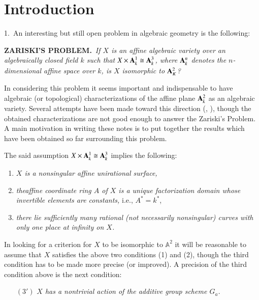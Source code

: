 \thispagestyle{empty}

\chapter*{Introduction}\pageoriginale


1.~An interesting but still open problem in algebraic geometry is the following:

\medskip
\noindent
{\bf ZARISKI'S PROBLEM.}~{\em If $X$ is an affine algebraic variety
  over an algebraically closed field $k$ such that $X \times
  \mathbf{A}^{1}_{k}\cong \mathbf{A}^{3}_{k}$, where $\mathbf{A}^{n}_{k}$ denotes the
  $n$-dimensional affine space over $k$, is $X$ isomorphic to
  $\mathbf{A}^{2}_{K}$?} 
\medskip

In considering this problem it seems important and indispensable to
have algebraic (or topological) characterizations of the affine plane
$\mathbf{A}^{2}_{k}$ as an algebraic variety. Several attempts have been made
toward this direction (\cf \cite{45}, \cite{32}), though the obtained
characterizations are not good enough to answer the Zariski's
Problem. A main motivation in writing these notes is to put together
the results which have been obtained so far surrounding this problem. 

The said assumption $X\times \mathbf{A}^{1}_{k}\cong \mathbf{A}^{3}_{k}$ implies
the following:
\begin{enumerate}
\renewcommand{\theenumi}{\arabic{enumi}}
\renewcommand{\labelenumi}{(\theenumi)}
\item {\em $X$ is a nonsingular affine unirational surface,}

\item {\em the\pageoriginale affine coordinate ring $A$ of $X$ is a
  unique factorization domain whose invertible elements are
  constants,} i.e., $A^{\ast}=k^{\ast}$,

\item {\em there lie sufficiently many rational (not necessarily
  nonsingular) curves with only one place at infinity on $X$.}
\end{enumerate}

In looking for a criterion for $X$ to be isomorphic to
$\mathbb{A}^{2}$ it will be reasonable to assume that $X$ satisfies
the above two conditions (1) and (2), though the third condition has
to be made more precise (or improved). A precision of the third
condition above is the next condition:

\eject

\begin{itemize}
\item[$(3')$] {\em $X$ has a nontrivial action of the additive group
  scheme $G_{a}$.}
\end{itemize}

